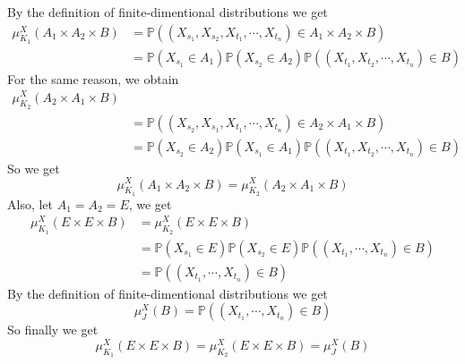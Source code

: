 \documentclass[../main]{subfiles}
\begin{document}
\begin{solution}
	By the definition of finite-dimentional distributions we get
	\[
		\begin{aligned}
			\mu^X_{K_1}(A_1 \times A_2 \times B) & =\mathbb{P}((X_{s_1},X_{s_2},X_{t_1},\cdots,X_{t_n}) \in A_1 \times A_2 \times B)                         \\
			                                     & =\mathbb{P}(X_{s_1} \in A_1)\mathbb{P}(X_{s_2} \in A_2)\mathbb{P}((X_{t_1},X_{t_2},\cdots,X_{t_n}) \in B)
		\end{aligned}
	\]
	For the same reason, we obtain
	\[
		\begin{aligned}
			\mu^X_{K_2}(A_2 \times A_1 \times B)                                                                         \\
			 & =\mathbb{P}((X_{s_2},X_{s_1},X_{t_1},\cdots,X_{t_n}) \in A_2 \times A_1 \times B)                         \\
			 & =\mathbb{P}(X_{s_2} \in A_2)\mathbb{P}(X_{s_1} \in A_1)\mathbb{P}((X_{t_1},X_{t_2},\cdots,X_{t_n}) \in B)
		\end{aligned}
	\]
	So we get
	\[
		\mu^X_{K_1}(A_1 \times A_2 \times B)=\mu^X_{K_2}(A_2 \times A_1 \times B)
	\]
	Also, let \(A_1=A_2=E\), we get
	\[
		\begin{aligned}
			\mu^X_{K_1}(E \times E \times B) & =\mu^X_{K_2}(E \times E \times B)                                                             \\
			                                 & =\mathbb{P}(X_{s_1} \in E)\mathbb{P}(X_{s_2} \in E)\mathbb{P}((X_{t_1},\cdots,X_{t_n}) \in B) \\
			                                 & =\mathbb{P}((X_{t_1},\cdots,X_{t_n}) \in B)
		\end{aligned}
	\]
	By the definition of finite-dimentional distributions we get
	\[
		\mu^X_{J}(B)=\mathbb{P}((X_{t_1},\cdots,X_{t_n}) \in B)
	\]
	So finally we get
	\[
		\mu^X_{K_1}(E \times E \times B)=\mu^X_{K_2}(E \times E \times B)=\mu^X_{J}(B)
	\]
\end{solution}
\end{document}
